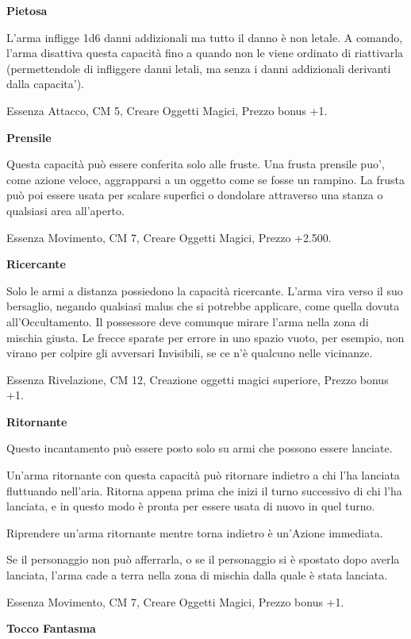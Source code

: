 \documentclass[a4paper,11pt,twoside,openany]{book}
\begin{document}
{\textbf{Pietosa}

L'arma infligge 1d6 danni addizionali ma tutto il danno è non letale. A comando, l'arma disattiva questa capacità fino a quando non le viene ordinato di riattivarla (permettendole di infliggere danni letali, ma senza i danni addizionali derivanti dalla capacita').

Essenza Attacco, CM 5, Creare Oggetti Magici, Prezzo bonus +1.

\textbf{Prensile}

Questa capacità può essere conferita solo alle fruste. Una frusta prensile puo', come azione veloce, aggrapparsi a un oggetto come se fosse un rampino. La frusta può poi essere usata per scalare superfici o dondolare attraverso una stanza o qualsiasi area all'aperto.

Essenza Movimento, CM 7, Creare Oggetti Magici, Prezzo +2.500.

\textbf{Ricercante}

Solo le armi a distanza possiedono la capacità ricercante. L'arma vira verso il suo bersaglio, negando qualsiasi malus che si potrebbe applicare, come quella dovuta all'Occultamento. Il possessore deve comunque mirare l'arma nella zona di mischia giusta. Le frecce sparate per errore in uno spazio vuoto, per esempio, non virano per colpire gli avversari Invisibili, se ce n'è qualcuno nelle vicinanze.

Essenza Rivelazione, CM 12, Creazione oggetti magici superiore, Prezzo bonus +1.

\textbf{Ritornante}

Questo incantamento può essere posto solo su armi che possono essere
lanciate. 

Un'arma ritornante con questa capacità può ritornare indietro a chi l'ha lanciata fluttuando nell'aria. Ritorna appena prima che inizi il turno successivo di chi l'ha lanciata, e in questo modo è pronta per essere usata di nuovo in quel turno. 

Riprendere un'arma ritornante mentre torna indietro è un'Azione immediata.

Se il personaggio non può afferrarla, o se il personaggio si è spostato dopo averla lanciata, l'arma cade a terra nella zona di mischia dalla quale è stata lanciata.

Essenza Movimento, CM 7, Creare Oggetti Magici, Prezzo bonus +1.

\textbf{Tocco Fantasma}

}
\end{document}
